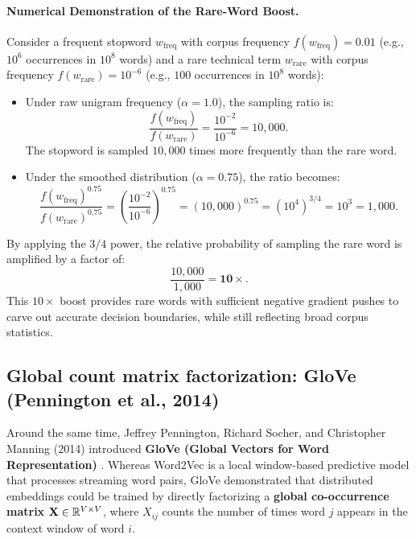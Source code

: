 \documentclass[../../main.tex]{subfiles}
\begin{document}
\paragraph{Numerical Demonstration of the Rare-Word Boost.}
Consider a frequent stopword $w_{\text{freq}}$ with corpus frequency $f(w_{\text{freq}}) = 0.01$ (e.g., $10^6$ occurrences in $10^8$ words) and a rare technical term $w_{\text{rare}}$ with corpus frequency $f(w_{\text{rare}}) = 10^{-6}$ (e.g., $100$ occurrences in $10^8$ words):
\begin{itemize}
    \item Under raw unigram frequency ($\alpha = 1.0$), the sampling ratio is:
    \begin{equation}
    \label{eq:ratio_raw}
    \frac{f(w_{\text{freq}})}{f(w_{\text{rare}})} = \frac{10^{-2}}{10^{-6}} = 10{,}000.
    \end{equation}
    The stopword is sampled $10{,}000$ times more frequently than the rare word.
    
    \item Under the smoothed distribution ($\alpha = 0.75$), the ratio becomes:
    \begin{equation}
    \label{eq:ratio_smoothed}
    \frac{f(w_{\text{freq}})^{0.75}}{f(w_{\text{rare}})^{0.75}} = \left( \frac{10^{-2}}{10^{-6}} \right)^{0.75} = (10{,}000)^{0.75} = (10^4)^{3/4} = 10^3 = 1{,}000.
    \end{equation}
\end{itemize}
By applying the $3/4$ power, the relative probability of sampling the rare word is amplified by a factor of:
\begin{equation}
\label{eq:boost_factor}
\frac{10{,}000}{1{,}000} = \mathbf{10\times}.
\end{equation}
This $10\times$ boost provides rare words with sufficient negative gradient pushes to carve out accurate decision boundaries, while still reflecting broad corpus statistics.

\subsection{Global count matrix factorization: GloVe (Pennington et al., 2014)}
\label{subsec:glove_comparison}

Around the same time, Jeffrey Pennington, Richard Socher, and Christopher Manning (2014) introduced \textbf{GloVe (Global Vectors for Word Representation)} \cite{pennington2014glove}. Whereas Word2Vec is a local window-based predictive model that processes streaming word pairs, GloVe demonstrated that distributed embeddings could be trained by directly factorizing a \textbf{global co-occurrence matrix} $\mathbf{X} \in \mathbb{R}^{V \times V}$, where $X_{ij}$ counts the number of times word $j$ appears in the context window of word $i$.
\end{document}
